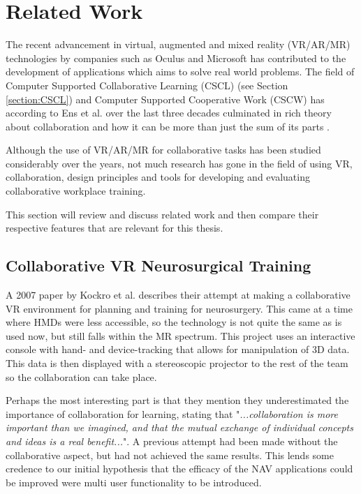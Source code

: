 
\chapter{Related Work}
The recent advancement in virtual, augmented and mixed reality (VR/AR/MR) technologies by companies such as Oculus and Microsoft 
has contributed to the development of applications which aims to solve real world problems. The field of Computer Supported Collaborative Learning (CSCL) (see Section \ref{section:CSCL}) and Computer Supported Cooperative Work (CSCW) has according to Ens et al. over the last three decades culminated in rich theory about collaboration and how it can be more than just the sum of its parts \cite{ens2019revisiting}.

Although the use of VR/AR/MR for collaborative tasks has been studied considerably over the years, not much research has gone in the field of using VR, collaboration, design principles and tools for developing and evaluating collaborative workplace training. 

This section will review and discuss related work and then compare their respective features that are relevant for this thesis. 




\section{Collaborative VR Neurosurgical Training}
A 2007 paper by Kockro et al. describes their attempt at making a collaborative VR environment for planning and training for neurosurgery\cite{kockro2007collaborative}. This came at a time where HMDs were less accessible, so the technology is not quite the same as is used now, but still falls within the MR spectrum. This project uses an interactive console with hand- and device-tracking that allows for manipulation of 3D data. This data is then displayed with a stereoscopic projector to the rest of the team so the collaboration can take place.

Perhaps the most interesting part is that they mention they underestimated the importance of collaboration for learning, stating that "\textit{...collaboration is more important than we imagined, and that the mutual exchange of individual concepts and ideas is a real benefit...}". A previous attempt had been made without the collaborative aspect, but had not achieved the same results. This lends some credence to our initial hypothesis that the efficacy of the NAV applications could be improved were multi user functionality to be introduced. 



